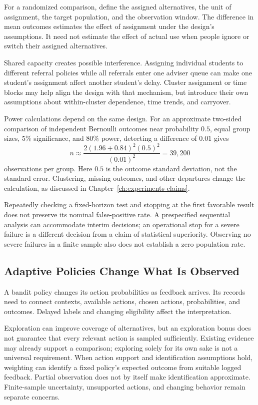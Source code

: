 For a randomized comparison, define the assigned alternatives, the unit of assignment, the target population, and the observation window. The difference in mean outcomes estimates the effect of assignment under the design's assumptions. It need not estimate the effect of actual use when people ignore or switch their assigned alternatives.

Shared capacity creates possible interference. Assigning individual students to different referral policies while all referrals enter one adviser queue can make one student's assignment affect another student's delay. Cluster assignment or time blocks may help align the design with that mechanism, but introduce their own assumptions about within-cluster dependence, time trends, and carryover.

Power calculations depend on the same design. For an approximate two-sided comparison of independent Bernoulli outcomes near probability $0.5$, equal group sizes, $5\%$ significance, and $80\%$ power, detecting a difference of $0.01$ gives
\[
n\approx
\frac{2(1.96+0.84)^2(0.5)^2}{(0.01)^2}
=39{,}200
\]
observations per group. Here $0.5$ is the outcome standard deviation, not the standard error. Clustering, missing outcomes, and other departures change the calculation, as discussed in Chapter~\ref{ch:experiments-claims}.

Repeatedly checking a fixed-horizon test and stopping at the first favorable result does not preserve its nominal false-positive rate. A prespecified sequential analysis can accommodate interim decisions; an operational stop for a severe failure is a different decision from a claim of statistical superiority. Observing no severe failures in a finite sample also does not establish a zero population rate.

\subsection{Adaptive Policies Change What Is Observed}

A bandit policy changes its action probabilities as feedback arrives. Its records need to connect contexts, available actions, chosen actions, probabilities, and outcomes. Delayed labels and changing eligibility affect the interpretation.

Exploration can improve coverage of alternatives, but an exploration bonus does not guarantee that every relevant action is sampled sufficiently. Existing evidence may already support a comparison; exploring solely for its own sake is not a universal requirement. When action support and identification assumptions hold, weighting can identify a fixed policy's expected outcome from suitable logged feedback. Partial observation does not by itself make identification approximate. Finite-sample uncertainty, unsupported actions, and changing behavior remain separate concerns.

